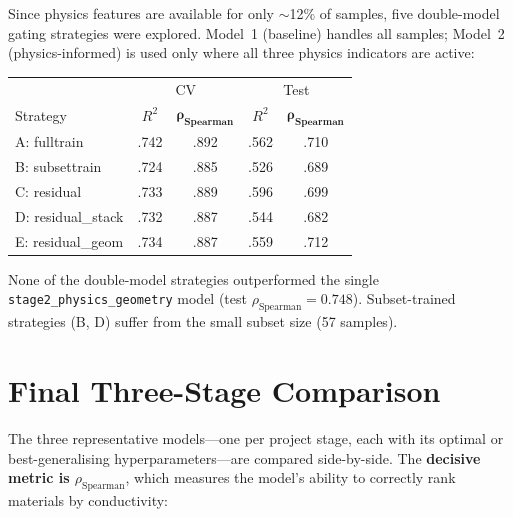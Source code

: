 \documentclass[11pt,a4paper]{article}
\newcommand{\Rtwo}{R^{2}}
\newcommand{\rhoS}{\rho_{\text{Spearman}}}
\begin{document}
Since physics features are available for only $\sim$12\% of samples, five
double-model gating strategies were explored.  Model~1 (baseline) handles all
samples; Model~2 (physics-informed) is used only where all three physics
indicators are active:

\begin{center}
      \small
      \begin{tabular}{lcc|cc}
            \toprule
                               & \multicolumn{2}{c|}{CV} & \multicolumn{2}{c}{Test}                                  \\
            Strategy           & $\Rtwo$                 & $\boldsymbol{\rhoS}$     & $\Rtwo$ & $\boldsymbol{\rhoS}$ \\
            \midrule
            A: fulltrain       & .742                    & .892                     & .562    & .710                 \\
            B: subsettrain     & .724                    & .885                     & .526    & .689                 \\
            C: residual        & .733                    & .889                     & .596    & .699                 \\
            D: residual\_stack & .732                    & .887                     & .544    & .682                 \\
            E: residual\_geom  & .734                    & .887                     & .559    & .712                 \\
            \bottomrule
      \end{tabular}
\end{center}

None of the double-model strategies outperformed the single
\texttt{stage2\_physics\_geometry} model (test $\rhoS = 0.748$).
Subset-trained strategies (B, D) suffer from the small subset size (57
samples).

\section{Final Three-Stage Comparison}
\label{sec:final}

The three representative models---one per project stage, each with its optimal
or best-generalising hyperparameters---are compared side-by-side.  The
\textbf{decisive metric is $\rhoS$}, which measures the model's ability to
correctly rank materials by conductivity:
\end{document}
